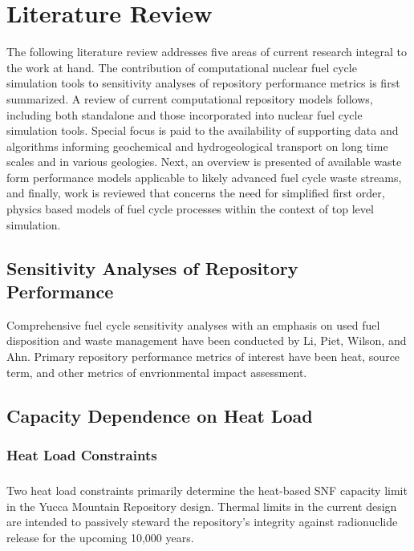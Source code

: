 \chapter{Literature Review}
The following literature review addresses five areas of current research integral to the work at hand. The contribution of computational nuclear fuel cycle simulation tools to sensitivity analyses of repository performance metrics is first summarized. A review of current computational repository models follows, including both standalone and those incorporated into nuclear fuel cycle simulation tools. Special focus is paid to the availability of supporting data and algorithms informing geochemical and hydrogeological transport on long time scales and in various geologies. Next, an overview is presented of available waste form performance models applicable to likely advanced fuel cycle waste streams, and finally, work is reviewed that concerns the need for simplified first order, physics based models of fuel cycle processes within the context of top level simulation. 
\section{Sensitivity Analyses of Repository Performance}
Comprehensive fuel cycle sensitivity analyses with an emphasis on used fuel disposition and waste management have been conducted by Li, Piet, Wilson, and Ahn. Primary repository performance metrics of interest have been heat, source term, and other metrics of envrionmental impact assessment.

\section{Capacity Dependence on Heat Load}
\subsection{Heat Load Constraints}
\paragraph{}
Two heat load constraints primarily determine the heat-based SNF capacity limit in the Yucca Mountain Repository design. Thermal limits in the current design are intended to passively steward the repository's integrity against radionuclide release for the upcoming 10,000 years.
